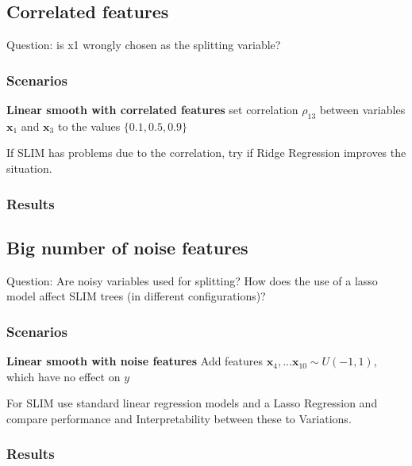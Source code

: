 \newpage
\subsection{Correlated features}
Question: is x1 wrongly chosen as the splitting variable?
\subsubsection{Scenarios}

\textbf{Linear smooth with correlated features} set correlation $\rho_{13}$ between  variables $\textbf{x}_1$ and $\textbf{x}_3$ to the values $\{0.1, 0.5, 0.9\}$

If SLIM has problems due to the correlation, try if Ridge Regression improves the situation.

\subsubsection{Results}


\subsection{Big number of noise features}
Question: Are noisy variables used for splitting? How does the use of a lasso model affect SLIM trees (in different configurations)?
\subsubsection{Scenarios}
\textbf{Linear smooth with noise features}
Add features $\textbf{x}_{4}, ... \textbf{x}_{10} \sim U(-1,1)$, which have no effect on $y$

For SLIM use standard linear regression models and a Lasso Regression and compare performance and Interpretability between these to Variations.

\subsubsection{Results}


